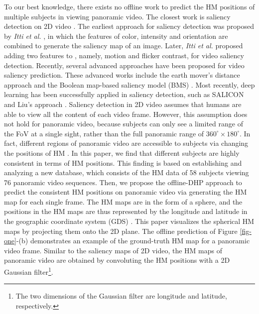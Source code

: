 \documentclass[10pt,journal,compsoc]{IEEEtran}
\begin{document}
To our best knowledge, there exists no offline work to predict the HM positions of multiple subjects in viewing panoramic video. The closest work is saliency detection on 2D video \cite{borji2013state}. The earliest approach for saliency detection was proposed by \textit{Itti et al.} \cite{itti1998model}, in which the features of color, intensity and orientation are combined to generate the saliency map of an image. Later, \textit{Itti et al.} \cite{itti2004automatic} proposed adding two features to \cite{itti1998model}, namely, motion and flicker contrast, for video saliency detection. Recently, several advanced approaches have been proposed for video saliency prediction. These advanced works include the earth mover's distance approach \cite{lin2013visual} and the Boolean map-based saliency model (BMS) \cite{zhang2016exploiting}.
Most recently, deep learning has been successfully applied in saliency detection,
such as SALICON \cite{huang2015salicon} and Liu's approach \cite{Liu2017cvpr}.
Saliency detection in 2D video assumes that humans are able to view all the content of each video frame.
However, this assumption does not hold for panoramic video, because subjects can only see a limited range of the FoV at a single sight, rather than the full panoramic range of $360^{\circ} \times 180^{\circ}$.
In fact, different regions of panoramic video are accessible to subjects via changing the positions of HM \cite{lowe2015visualization}.
In this paper, we find that different subjects are highly consistent in terms of HM positions.
This finding is based on establishing and analyzing a new database, which consists of the HM data of 58 subjects viewing 76 panoramic video sequences.
Then, we propose the offline-DHP approach to predict the consistent HM positions on panoramic video via generating the HM map for each single frame.
The HM maps are in the form of a sphere, and the positions in the HM maps are thus represented by the longitude and latitude in the geographic coordinate system (GDS) \cite{Goodchild2007}. This paper visualizes the spherical HM maps by projecting them onto the 2D plane.
The offline prediction of Figure \ref{fig-one}-(b) demonstrates an example of the ground-truth HM map for a panoramic video frame. Similar to the saliency maps of 2D video, the HM maps of panoramic video are obtained by convoluting the HM positions with a 2D Gaussian filter\footnote{The two dimensions of the Gaussian filter are longitude and latitude, respectively.}.

\end{document}

